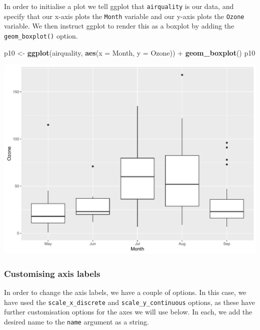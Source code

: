 \documentclass[]{article}
\newenvironment{Shaded}{\begin{snugshade}}{\end{snugshade}}
\newcommand{\KeywordTok}[1]{\textcolor[rgb]{0.13,0.29,0.53}{\textbf{{#1}}}}
\newcommand{\DataTypeTok}[1]{\textcolor[rgb]{0.13,0.29,0.53}{{#1}}}
\newcommand{\StringTok}[1]{\textcolor[rgb]{0.31,0.60,0.02}{{#1}}}
\newcommand{\NormalTok}[1]{{#1}}
\begin{document}
In order to initialise a plot we tell ggplot that \texttt{airquality} is
our data, and specify that our x-axis plots the \texttt{Month} variable
and our y-axis plots the \texttt{Ozone} variable. We then instruct
ggplot to render this as a boxplot by adding the
\texttt{geom\_boxplot()} option.

\begin{Shaded}
\begin{Highlighting}[]
\NormalTok{p10 <-}\StringTok{ }\KeywordTok{ggplot}\NormalTok{(airquality, }\KeywordTok{aes}\NormalTok{(}\DataTypeTok{x =} \NormalTok{Month, }\DataTypeTok{y =} \NormalTok{Ozone)) +}\StringTok{ }
\StringTok{        }\KeywordTok{geom_boxplot}\NormalTok{()}
\NormalTok{p10}
\end{Highlighting}
\end{Shaded}

\begin{center}\includegraphics{0_all_posts_pdf/box_1-1} \end{center}

\subsubsection{Customising axis labels}\label{customising-axis-labels-3}

In order to change the axis labels, we have a couple of options. In this
case, we have used the \texttt{scale\_x\_discrete} and
\texttt{scale\_y\_continuous} options, as these have further
customisation options for the axes we will use below. In each, we add
the desired name to the \texttt{name} argument as a string.
\end{document}
